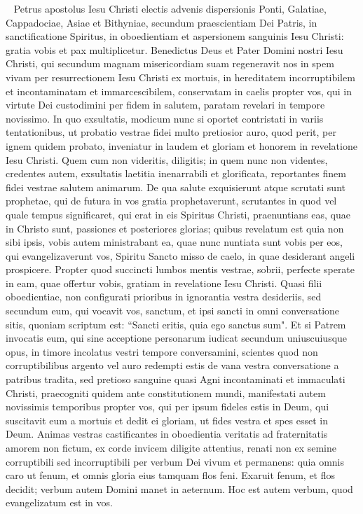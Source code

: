 
\begin{biblechapter}   
\verse Petrus apostolus Iesu Christi electis advenis dispersionis Ponti, Galatiae, Cappadociae, Asiae et Bithyniae, 
\verse secundum praescientiam Dei Patris, in sanctificatione Spiritus, in oboedientiam et aspersionem sanguinis Iesu Christi: gratia vobis et pax multiplicetur. 
\verse Benedictus Deus et Pater Domini nostri Iesu Christi, qui secundum magnam misericordiam suam regeneravit nos in spem vivam per resurrectionem Iesu Christi ex mortuis, 
\verse in hereditatem incorruptibilem et incontaminatam et immarcescibilem, conservatam in caelis propter vos, 
\verse qui in virtute Dei custodimini per fidem in salutem, paratam revelari in tempore novissimo. 
\verse In quo exsultatis, modicum nunc si oportet contristati in variis tentationibus,  
\verse ut probatio vestrae fidei multo pretiosior auro, quod perit, per ignem quidem probato, inveniatur in laudem et gloriam et honorem in revelatione Iesu Christi. 
\verse Quem cum non videritis, diligitis; in quem nunc non videntes, credentes autem, exsultatis laetitia inenarrabili et glorificata, 
\verse reportantes finem fidei vestrae salutem animarum. 
\verse De qua salute exquisierunt atque scrutati sunt prophetae, qui de futura in vos gratia prophetaverunt, 
\verse scrutantes in quod vel quale tempus significaret, qui erat in eis Spiritus Christi, praenuntians eas, quae in Christo sunt, passiones et posteriores glorias; 
\verse quibus revelatum est quia non sibi ipsis, vobis autem ministrabant ea, quae nunc nuntiata sunt vobis per eos, qui evangelizaverunt vos, Spiritu Sancto misso de caelo, in quae desiderant angeli prospicere. 
\verse Propter quod succincti lumbos mentis vestrae, sobrii, perfecte sperate in eam, quae offertur vobis, gratiam in revelatione Iesu Christi. 
\verse Quasi filii oboedientiae, non configurati prioribus in ignorantia vestra desideriis,  
\verse sed secundum eum, qui vocavit vos, sanctum, et ipsi sancti in omni conversatione sitis, 
\verse quoniam scriptum est: “Sancti eritis, quia ego sanctus sum". 
\verse Et si Patrem invocatis eum, qui sine acceptione personarum iudicat secundum uniuscuiusque opus, in timore incolatus vestri tempore conversamini, 
\verse scientes quod non corruptibilibus argento vel auro redempti estis de vana vestra conversatione a patribus tradita, 
\verse sed pretioso sanguine quasi Agni incontaminati et immaculati Christi, 
\verse praecogniti quidem ante constitutionem mundi, manifestati autem novissimis temporibus propter vos, 
\verse qui per ipsum fideles estis in Deum, qui suscitavit eum a mortuis et dedit ei gloriam, ut fides vestra et spes esset in Deum. 
\verse Animas vestras castificantes in oboedientia veritatis ad fraternitatis amorem non fictum, ex corde invicem diligite attentius, 
\verse renati non ex semine corruptibili sed incorruptibili per verbum Dei vivum et permanens: 
\verse quia omnis caro ut fenum, et omnis gloria eius tamquam flos feni. Exaruit fenum, et flos decidit; 
\verse verbum autem Domini manet in aeternum. Hoc est autem verbum, quod evangelizatum est in vos. 
\end{biblechapter}

